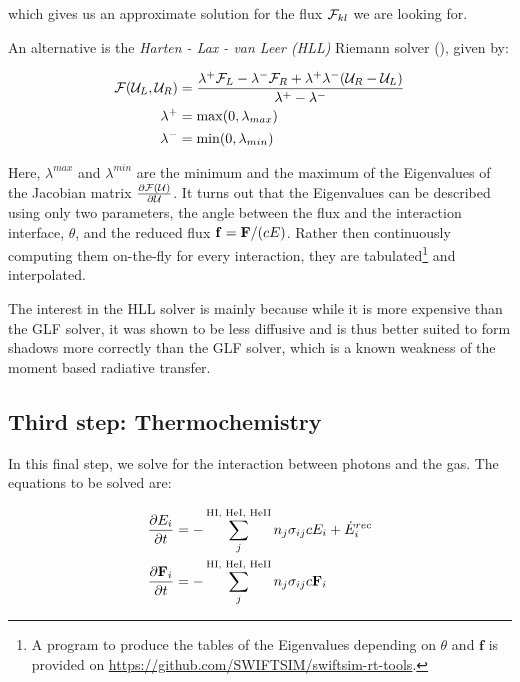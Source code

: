 which gives us an approximate solution for the flux $\mathcal{F}_{kl}$ we are looking for.



An alternative is the \emph{Harten - Lax - van Leer (HLL)} Riemann solver
(\cite{gonzalezHERACLESThreedimensionalRadiation2007}), given by:

\begin{align}
	\mathcal{F}(\mathcal{U}_L, \mathcal{U}_R) &=
		\frac{ \lambda^{+} \mathcal{F}_{L} - \lambda^{-} \mathcal{F}_{R} +  \lambda^{+}
\lambda^{-} (\mathcal{U}_R - \mathcal{U}_L)}{ \lambda^{+} - \lambda^{-} }
\label{eq:riemann-HLL} \\
    \lambda^+ &= \max(0, \lambda_{max})\\
    \lambda^- &= \min(0, \lambda_{min})
\end{align}


Here, $\lambda^{max}$ and $\lambda^{min}$ are the minimum and the maximum of the Eigenvalues of the
Jacobian matrix $\frac{\partial \mathcal{F}(\mathcal{U})}{\partial \mathcal{U}}$. It turns out that the Eigenvalues can be described
using only two parameters, the angle between the flux and the interaction interface, $\theta$, and
the reduced flux $\mathbf{f} = \mathbf{F} / (cE)$. Rather then continuously computing them on-the-fly for
every interaction, they are tabulated\footnote{
A program to produce the tables of the Eigenvalues depending on $\theta$ and $\mathbf{f}$ is
provided on \url{https://github.com/SWIFTSIM/swiftsim-rt-tools}.
}
and interpolated.

The interest in the HLL solver is mainly because while it is more expensive than the GLF solver, it
was shown \citep{ramses-rt13, gonzalezHERACLESThreedimensionalRadiation2007} to be less diffusive
and is thus better suited to form shadows more correctly than the GLF solver, which is a known
weakness of the moment based radiative transfer.











\subsection{Third step: Thermochemistry}


In this final step, we solve for the interaction between photons and the gas. The equations to be
solved are:

\begin{align*}
	\frac{\partial E_i}{\partial t}  &=
		- \sum\limits_{j}^{\text{HI, HeI, HeII}} n_j \sigma_{i j} c E_i + \dot E_i ^{rec}
\\
	\frac{\partial \mathbf{F}_i}{\partial t} &=
		- \sum\limits_{j}^{\text{HI, HeI, HeII}} n_j \sigma_{i j} c \mathbf{F}_i
\end{align*}

